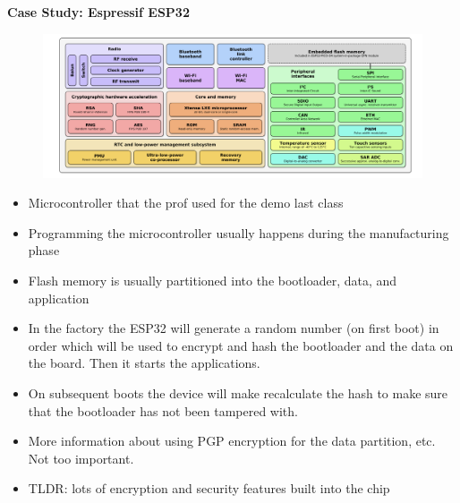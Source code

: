 \documentclass[../notes.tex]{subfiles}
\begin{document}
\begin{blockquote}
    \textbf{Case Study: Espressif ESP32} 

    \begin{figure}[H]
        \centering
        \includegraphics[width=0.8\linewidth]{img/image_2023-01-30-18-19-48.png}
    \end{figure}

    \begin{itemize}
        \item Microcontroller that the prof used for the demo last class
        \item Programming the microcontroller usually happens during the manufacturing phase
        \item Flash memory is usually partitioned into the bootloader, data, and application
        \item In the factory the ESP32 will generate a random number (on first boot) in order which will be used to encrypt and hash the bootloader and the data on the board. Then it starts the applications.
        \item On subsequent boots the device will make recalculate the hash to make sure that the bootloader has not been tampered with.
        \item More information about using PGP encryption for the data partition, etc. Not too important.
        \item TLDR: lots of encryption and security features built into the chip
    \end{itemize}
\end{blockquote}
\end{document}
